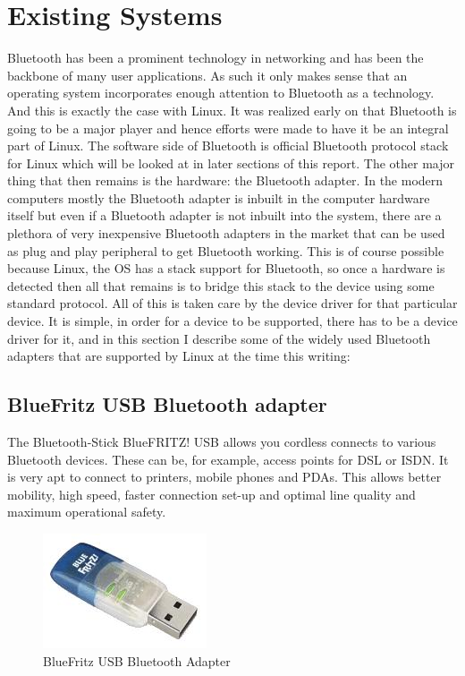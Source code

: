 \section{Existing Systems}
\noindent Bluetooth has been a prominent technology in networking and has been the backbone of many user applications. As such it only makes sense that an operating system incorporates enough attention to Bluetooth as a technology. And this is exactly the case with Linux. It was realized early on that Bluetooth is going to be a major player and hence efforts were made to have it be an integral part of Linux. The software side of Bluetooth is official Bluetooth protocol stack for Linux which will be looked at in later sections of this report. The other major thing that then remains is the hardware: the Bluetooth adapter. In the modern computers mostly the Bluetooth adapter is inbuilt in the computer hardware itself but even if a Bluetooth adapter is not inbuilt into the system, there are a plethora of very inexpensive Bluetooth adapters in the market that can be used as plug and play peripheral to get Bluetooth working. This is of course possible because Linux, the OS has a stack support for Bluetooth, so once a hardware is detected then all that remains is to bridge this stack to the device using some standard protocol. All of this is taken care by the device driver for that particular device. It is simple, in order for a device to be supported, there has to be a device driver for it, and in this section I describe some of the widely used Bluetooth adapters that are supported by Linux at the time this writing:
\subsection{BlueFritz USB Bluetooth adapter}
The Bluetooth-Stick BlueFRITZ! USB allows you cordless connects to various Bluetooth devices. These can be, for example, access points for DSL or ISDN. It is very apt to connect to printers, mobile phones and PDAs. This allows better mobility, high speed, faster connection set-up and optimal line quality and maximum operational safety.
\begin{figure}[ht]
	\centering
	\includegraphics[scale=0.5]{images/bluefritz_usb.png}
	\caption{BlueFritz USB Bluetooth Adapter}
\end{figure}
